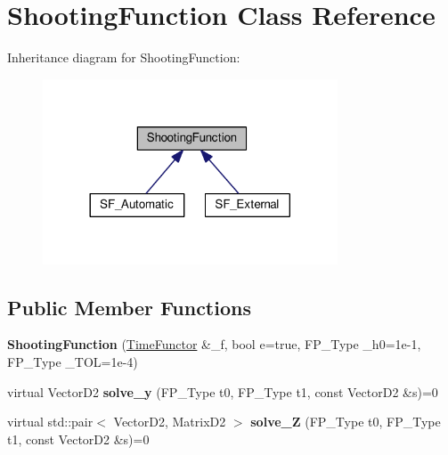 \hypertarget{classShootingFunction}{}\section{Shooting\+Function Class Reference}
\label{classShootingFunction}


Inheritance diagram for Shooting\+Function\+:\nopagebreak
\begin{figure}[H]
\begin{center}
\leavevmode
\includegraphics[width=248pt]{classShootingFunction__inherit__graph}
\end{center}
\end{figure}
\subsection*{Public Member Functions}
\begin{DoxyCompactItemize}
\item 
\mbox{\label{classShootingFunction_ae9f933dcdb1ad7b8bdb753483d3ef206}} 
{\bfseries Shooting\+Function} (\hyperlink{classTimeFunctor}{Time\+Functor} \&\+\_\+f, bool e=true, F\+P\+\_\+\+Type \+\_\+h0=1e-\/1, F\+P\+\_\+\+Type \+\_\+\+T\+O\+L=1e-\/4)
\item 
\mbox{\label{classShootingFunction_acb29074b32316fdd368d71a775983f81}} 
virtual Vector\+D2 {\bfseries solve\+\_\+y} (F\+P\+\_\+\+Type t0, F\+P\+\_\+\+Type t1, const Vector\+D2 \&s)=0
\item 
\mbox{\label{classShootingFunction_a41360056996ee70c43c4538acd6e28d8}} 
virtual std\+::pair$<$ Vector\+D2, Matrix\+D2 $>$ {\bfseries solve\+\_\+Z} (F\+P\+\_\+\+Type t0, F\+P\+\_\+\+Type t1, const Vector\+D2 \&s)=0
\end{DoxyCompactItemize}
